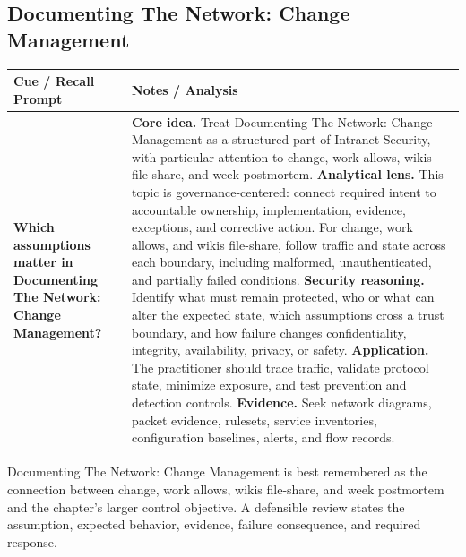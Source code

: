 \documentclass[11pt]{article}
\newcommand{\CornellHeader}{%
\rowcolor{Navy}\color{white}\bfseries Cue / Recall Prompt & \color{white}\bfseries Notes / Analysis\\\hline}
\newcommand{\CornellRow}[2]{%
\cellcolor{CueGray}\RaggedRight\textbf{#1} & \RaggedRight #2\\\hline}
\begin{document}
\subsection*{Documenting The Network: Change Management}
\begin{longtable}{>{\RaggedRight\arraybackslash}p{}|>{\RaggedRight\arraybackslash}p{}}
\CornellHeader
\CornellRow{Which assumptions matter in Documenting The Network: Change Management?}{\textbf{Core idea.} Treat Documenting The Network: Change Management as a structured part of Intranet Security, with particular attention to change, work allows, wikis file-share, and week postmortem. \textbf{Analytical lens.} This topic is governance-centered: connect required intent to accountable ownership, implementation, evidence, exceptions, and corrective action. For change, work allows, and wikis file-share, follow traffic and state across each boundary, including malformed, unauthenticated, and partially failed conditions. \textbf{Security reasoning.} Identify what must remain protected, who or what can alter the expected state, which assumptions cross a trust boundary, and how failure changes confidentiality, integrity, availability, privacy, or safety. \textbf{Application.} The practitioner should trace traffic, validate protocol state, minimize exposure, and test prevention and detection controls. \textbf{Evidence.} Seek network diagrams, packet evidence, rulesets, service inventories, configuration baselines, alerts, and flow records.}
\end{longtable}
\begin{topicsummary}
Documenting The Network: Change Management is best remembered as the connection between change, work allows, wikis file-share, and week postmortem and the chapter's larger control objective. A defensible review states the assumption, expected behavior, evidence, failure consequence, and required response.
\end{topicsummary}
\end{document}

